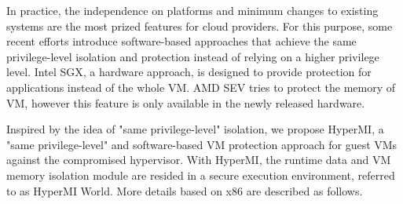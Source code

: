 \documentclass[conference]{IEEEtran}
\begin{document}
In practice, the independence on platforms and minimum changes to existing systems are the most prized features for cloud providers. For this purpose,
some recent efforts introduce software-based approaches that achieve the same privilege-level isolation and protection instead of relying on a higher privilege level. 
 Intel SGX, a hardware approach, is designed to provide protection for applications instead of the whole VM. AMD SEV tries to protect the memory of VM, however this feature is only available in the newly released hardware. 



Inspired by the idea of "same privilege-level" isolation, we propose HyperMI, a "same privilege-level" and software-based VM protection approach for guest VMs against the compromised hypervisor. 
With HyperMI, the runtime data and VM memory isolation module are resided in a secure execution environment, referred to as HyperMI World.
More details based on x86 are described as follows.
\end{document}
